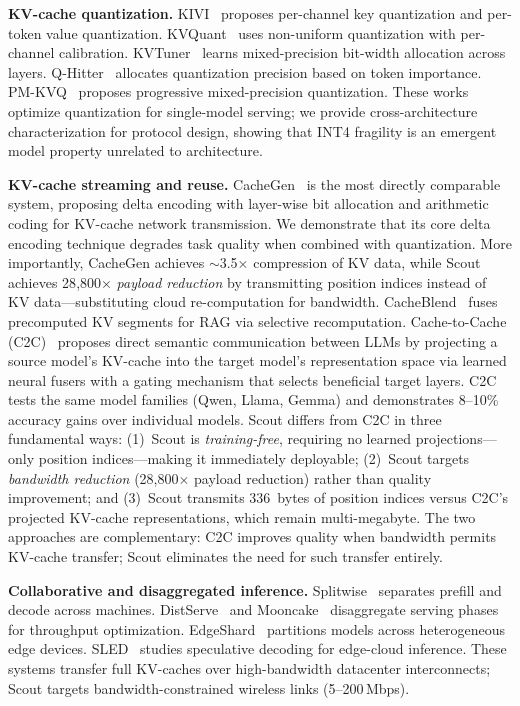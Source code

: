 \documentclass[journal]{IEEEtran}
\begin{document}
\textbf{KV-cache quantization.}
KIVI~\cite{kivi} proposes per-channel key quantization and per-token value quantization.
KVQuant~\cite{kvquant} uses non-uniform quantization with per-channel calibration.
KVTuner~\cite{kvtuner} learns mixed-precision bit-width allocation across layers.
Q-Hitter~\cite{qhitter} allocates quantization precision based on token importance.
PM-KVQ~\cite{pmkvq} proposes progressive mixed-precision quantization.
These works optimize quantization for single-model serving; we provide cross-architecture characterization for protocol design, showing that INT4 fragility is an emergent model property unrelated to architecture.

\textbf{KV-cache streaming and reuse.}
CacheGen~\cite{cachegen} is the most directly comparable system, proposing delta encoding with layer-wise bit allocation and arithmetic coding for KV-cache network transmission.
We demonstrate that its core delta encoding technique degrades task quality when combined with quantization.
More importantly, CacheGen achieves $\sim$3.5$\times$ compression of KV data, while Scout achieves 28{,}800$\times$ \emph{payload reduction} by transmitting position indices instead of KV data---substituting cloud re-computation for bandwidth.
CacheBlend~\cite{cacheblend} fuses precomputed KV segments for RAG via selective recomputation.
Cache-to-Cache (C2C)~\cite{c2c} proposes direct semantic communication between LLMs by projecting a source model's KV-cache into the target model's representation space via learned neural fusers with a gating mechanism that selects beneficial target layers.
C2C tests the same model families (Qwen, Llama, Gemma) and demonstrates 8--10\% accuracy gains over individual models.
Scout differs from C2C in three fundamental ways: (1)~Scout is \emph{training-free}, requiring no learned projections---only position indices---making it immediately deployable; (2)~Scout targets \emph{bandwidth reduction} (28{,}800$\times$ payload reduction) rather than quality improvement; and (3)~Scout transmits 336~bytes of position indices versus C2C's projected KV-cache representations, which remain multi-megabyte.
The two approaches are complementary: C2C improves quality when bandwidth permits KV-cache transfer; Scout eliminates the need for such transfer entirely.

\textbf{Collaborative and disaggregated inference.}
Splitwise~\cite{splitwise} separates prefill and decode across machines.
DistServe~\cite{distserve} and Mooncake~\cite{mooncake} disaggregate serving phases for throughput optimization.
EdgeShard~\cite{edgeshard} partitions models across heterogeneous edge devices.
SLED~\cite{sled} studies speculative decoding for edge-cloud inference.
These systems transfer full KV-caches over high-bandwidth datacenter interconnects; Scout targets bandwidth-constrained wireless links (5--200\,Mbps).
\end{document}
